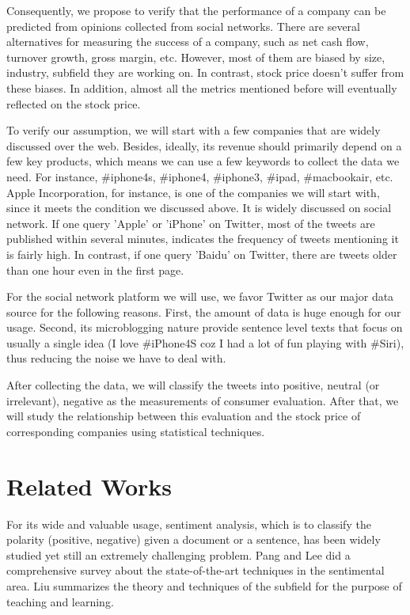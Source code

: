 \documentclass[12pt]{article}
\begin{document}
Consequently, we propose to verify that the performance of a company can be predicted from opinions collected from social networks. There are several alternatives for measuring the success of a company, such as net cash flow, turnover growth, gross margin, etc. However, most of them are biased by size, industry, subfield they are working on. In contrast, stock price doesn't suffer from these biases. In addition, almost all the metrics mentioned before will eventually reflected on the stock price.

To verify our assumption, we will start with a few companies that are widely discussed over the web. Besides, ideally, its revenue should primarily depend on a few key products, which means we can use a few keywords to collect the data we need. For instance, \#iphone4s, \#iphone4, \#iphone3, \#ipad, \#macbookair, etc. Apple Incorporation, for instance, is one of the companies we will start with, since it meets the condition we discussed above. It is widely discussed on social network. If one query 'Apple' or 'iPhone' on Twitter, most of the tweets are published within several minutes, indicates the frequency of tweets mentioning it is fairly high. In contrast, if one query 'Baidu' on Twitter, there are tweets older than one hour even in the first page.

For the social network platform we will use, we favor Twitter as our major data source for the following reasons. First, the amount of data is huge enough for our usage. Second, its microblogging nature provide sentence level texts that focus on usually a single idea (I love \#iPhone4S coz I had a lot of fun playing with \#Siri), thus reducing the noise we have to deal with.

After collecting the data, we will classify the tweets into positive, neutral (or irrelevant), negative as the measurements of consumer evaluation. After that, we will study the relationship between this evaluation and the stock price of corresponding companies using statistical techniques.

\section{Related Works}
For its wide and valuable usage, sentiment analysis, which is to classify the polarity (positive, negative) given a document or a sentence, has been widely studied yet still an extremely challenging problem. Pang and Lee \cite{Pang:08} did a comprehensive survey about the state-of-the-art techniques in the sentimental area. Liu \cite{Liu:10} summarizes the theory and techniques of the subfield for the purpose of teaching and learning.
\end{document}
